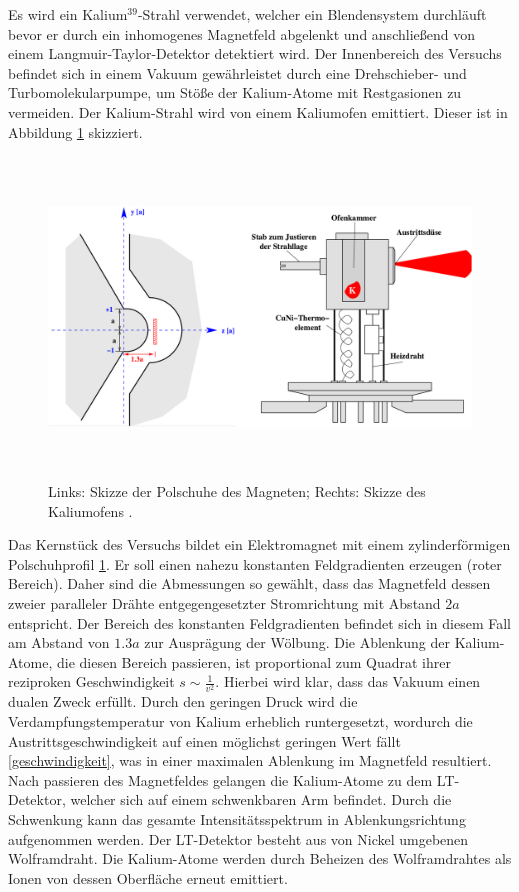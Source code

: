 Es wird ein Kalium$^{39}$-Strahl verwendet, welcher ein Blendensystem durchläuft bevor er durch ein inhomogenes Magnetfeld abgelenkt und anschließend von einem Langmuir-Taylor-Detektor detektiert wird.
Der Innenbereich des Versuchs befindet sich in einem Vakuum gewährleistet durch eine Drehschieber- und Turbomolekularpumpe, um Stöße der Kalium-Atome mit Restgasionen zu vermeiden.
Der Kalium-Strahl wird von einem Kaliumofen emittiert.
Dieser ist in Abbildung \ref{fig:aufbau2} skizziert.
\begin{figure}
  \centering
  \includegraphics[height=8.5cm]{ressources/aufbau2.png}
  \caption{Links: Skizze der Polschuhe des Magneten; Rechts: Skizze des Kaliumofens \cite{skript}.}
  \label{fig:aufbau2}
\end{figure}
Das Kernstück des Versuchs bildet ein Elektromagnet mit einem zylinderförmigen Polschuhprofil \ref{fig:aufbau2}.
Er soll einen nahezu konstanten Feldgradienten erzeugen (roter Bereich).
Daher sind die Abmessungen so gewählt, dass das Magnetfeld dessen zweier paralleler Drähte entgegengesetzter Stromrichtung mit Abstand $2a$ entspricht.
Der Bereich des konstanten Feldgradienten befindet sich in diesem Fall am Abstand von $1.3a$ zur Ausprägung der Wölbung.
Die Ablenkung der Kalium-Atome, die diesen Bereich passieren, ist proportional zum Quadrat ihrer reziproken Geschwindigkeit $s\sim \frac{1}{v^2}$.
Hierbei wird klar, dass das Vakuum einen dualen Zweck erfüllt.
Durch den geringen Druck wird die Verdampfungstemperatur von Kalium erheblich runtergesetzt, wordurch die Austrittsgeschwindigkeit auf einen möglichst geringen Wert fällt \eqref{geschwindigkeit}, was in einer maximalen Ablenkung im Magnetfeld resultiert.\\
Nach passieren des Magnetfeldes gelangen die Kalium-Atome zu dem LT-Detektor, welcher sich auf einem schwenkbaren Arm befindet.
Durch die Schwenkung kann das gesamte Intensitätsspektrum in Ablenkungsrichtung aufgenommen werden.
Der LT-Detektor besteht aus von Nickel umgebenen Wolframdraht.
Die Kalium-Atome werden durch Beheizen des Wolframdrahtes als Ionen von dessen Oberfläche erneut emittiert.
